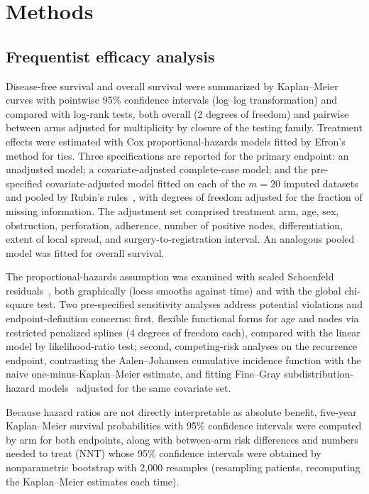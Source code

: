\section{Methods}\label{sec:methods}

\subsection{Frequentist efficacy analysis}\label{sec:methods-freq}

Disease-free survival and overall survival were summarized by
Kaplan--Meier curves with pointwise 95\% confidence intervals
(log--log transformation) and compared with log-rank tests, both overall
(2 degrees of freedom) and pairwise between arms adjusted for
multiplicity by closure of the testing family. Treatment effects were
estimated with Cox proportional-hazards models fitted by Efron's method
for ties. Three specifications are reported for the primary endpoint: an
unadjusted model; a covariate-adjusted complete-case model; and the
pre-specified covariate-adjusted model fitted on each of the $m=20$
imputed datasets and pooled by Rubin's rules~\cite{rubin1987}, with
degrees of freedom adjusted for the fraction of missing information.
The adjustment set comprised treatment arm, age, sex, obstruction,
perforation, adherence, number of positive nodes, differentiation, extent
of local spread, and surgery-to-registration interval. An analogous
pooled model was fitted for overall survival.

The proportional-hazards assumption was examined with scaled Schoenfeld
residuals~\cite{grambsch1994}, both graphically (loess smooths against
time) and with the global chi-square test. Two pre-specified sensitivity
analyses address potential violations and endpoint-definition concerns:
first, flexible functional forms for age and nodes via restricted
penalized splines (4 degrees of freedom each), compared with the linear
model by likelihood-ratio test; second, competing-risk analyses on the
recurrence endpoint, contrasting the Aalen--Johansen cumulative incidence
function with the naive one-minus-Kaplan--Meier estimate, and fitting
Fine--Gray subdistribution-hazard models~\cite{finegray1999} adjusted for
the same covariate set.

Because hazard ratios are not directly interpretable as absolute
benefit, five-year Kaplan--Meier survival probabilities with 95\%
confidence intervals were computed by arm for both endpoints, along with
between-arm risk differences and numbers needed to treat (NNT) whose
95\% confidence intervals were obtained by nonparametric bootstrap with
2{,}000 resamples (resampling patients, recomputing the Kaplan--Meier
estimates each time).

